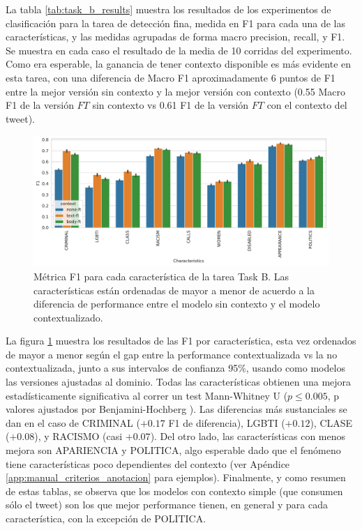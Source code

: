 La tabla \ref{tab:task_b_results} muestra los resultados de los experimentos de clasificación para la tarea de detección fina, medida en F1 para cada una de las características, y las medidas agrupadas de forma macro precision, recall, y F1. Se muestra en cada caso el resultado de la media de 10 corridas del experimento. Como era esperable, la ganancia de tener contexto disponible es más evidente en esta tarea, con una diferencia de Macro F1 aproximadamente 6 puntos de F1 entre la mejor versión sin contexto y la mejor versión con contexto (0.55 Macro F1 de la versión $FT$ sin contexto vs 0.61 F1 de la versión $FT$ con el contexto del tweet).


\begin{figure}[t]
    \centering
    \includegraphics[width=\textwidth]{img/task_b_scores.pdf}
    \caption{Métrica F1 para cada característica de la tarea Task B. Las características están ordenadas de mayor a menor de acuerdo a la diferencia de performance entre el modelo sin contexto y el modelo contextualizado. }
    \label{fig:barplot_task_b_results}
\end{figure}

La figura \ref{fig:barplot_task_b_results} muestra los resultados de las F1 por característica, esta vez ordenados de mayor a menor según el gap entre la performance contextualizada vs la no contextualizada, junto a sus intervalos de confianza 95\%, usando como modelos las versiones ajustadas al dominio. Todas las características obtienen una mejora estadísticamente significativa al correr un test Mann-Whitney U ($p \leq 0.005$, p valores ajustados por Benjamini-Hochberg \cite{benjamini1995controlling}). Las diferencias más sustanciales se dan en el caso de CRIMINAL ($+0.17$ F1 de diferencia), LGBTI ($+0.12$), CLASE ($+0.08$), y RACISMO (casi $+0.07$). Del otro lado, las características con menos mejora son APARIENCIA y POLITICA, algo esperable dado que el fenómeno tiene características poco dependientes del contexto (ver Apéndice \ref{app:manual_criterios_anotacion} para ejemplos). Finalmente, y como resumen de estas tablas, se observa que los modelos con contexto simple (que consumen sólo el tweet) son los que mejor performance tienen, en general y para cada característica, con la excepción de POLITICA.


